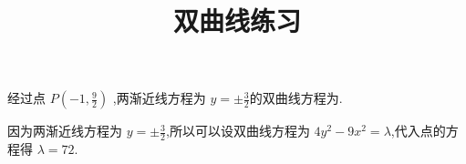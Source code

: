 \documentclass{exam-zh}
\begin{document}
 

\title{双曲线练习}
\maketitle


\begin{question}
  经过点 $P(-1,\frac{9}{2})$ ,两渐近线方程为 $y = \pm \frac{3}{2}$的双曲线方程为\fillin[$\frac{y^2}{18}=\frac{x^2}{8} =1$].
\end{question}

\begin{solution}
    因为两渐近线方程为 $y = \pm \frac{3}{2}$,所以可以设双曲线方程为 $4y^2- 9x^2 = \lambda$,代入点的方程得 $\lambda =72$.
\end{solution}
\end{document}
